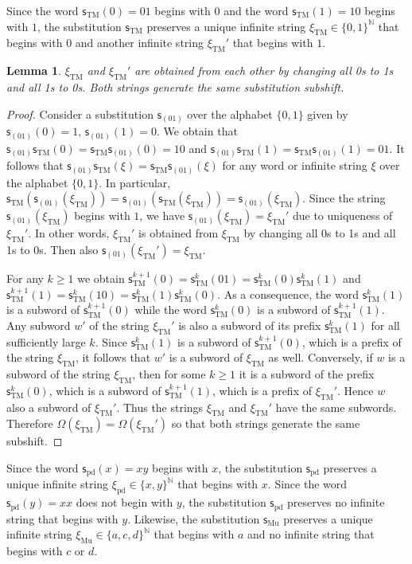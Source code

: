 \documentclass[12pt]{article}
\newtheorem{lemma}[theorem]{Lemma}
\theoremstyle{definition}
\def\bN{\mathbb{N}}
\def\Om{\Omega}
\def\subst{\mathsf{s}}
\def\TM{\subst_{\mathrm{TM}}}
\def\pd{\subst_{\mathrm{pd}}}
\def\sub{\subst_{\mathrm{Mu}}}
\def\xiTM{\xi_{\mathrm{TM}}}
\def\xipd{\xi_{\mathrm{pd}}}
\def\xiGE{\xi_{\mathrm{Mu}}}
\begin{document}
Since the word $\TM(0)=01$ begins with $0$ and the word $\TM(1)=10$ begins 
with $1$, the substitution $\TM$ preserves a unique infinite string 
$\xiTM\in\{0,1\}^{\bN}$ that begins with $0$ and another infinite string 
$\xiTM'$ that begins with $1$.

\begin{lemma}\label{TM-unique}
$\xiTM$ and $\xiTM'$ are obtained from each other by changing all 0s to 1s 
and all 1s to 0s.  Both strings generate the same substitution subshift.
\end{lemma}

\begin{proof}
Consider a substitution $\mathsf{s}_{(01)}$ over the alphabet $\{0,1\}$ 
given by $\mathsf{s}_{(01)}(0)=1$, $\mathsf{s}_{(01)}(1)=0$.  We obtain 
that $\mathsf{s}_{(01)}\TM(0)=\TM\mathsf{s}_{(01)}(0)=10$ and 
$\mathsf{s}_{(01)}\TM(1)=\TM\mathsf{s}_{(01)}(1)=01$.  It follows that 
$\mathsf{s}_{(01)}\TM(\xi)=\TM\mathsf{s}_{(01)}(\xi)$ for any word or 
infinite string $\xi$ over the alphabet $\{0,1\}$.  In particular, 
$\TM(\mathsf{s}_{(01)}(\xiTM))=\mathsf{s}_{(01)}(\TM(\xiTM)) 
=\mathsf{s}_{(01)}(\xiTM)$.  Since the string $\mathsf{s}_{(01)}(\xiTM)$ 
begins with $1$, we have $\mathsf{s}_{(01)}(\xiTM)=\xiTM'$ due to 
uniqueness of $\xiTM'$.  In other words, $\xiTM'$ is obtained from $\xiTM$ 
by changing all 0s to 1s and all 1s to 0s.  Then also 
$\mathsf{s}_{(01)}(\xiTM')=\xiTM$.

For any $k\ge1$ we obtain $\TM^{k+1}(0)=\TM^k(01)=\TM^k(0)\TM^k(1)$ and 
$\TM^{k+1}(1)=\TM^k(10)=\TM^k(1)\TM^k(0)$.  As a consequence, the word 
$\TM^k(1)$ is a subword of $\TM^{k+1}(0)$ while the word $\TM^k(0)$ is a 
subword of $\TM^{k+1}(1)$.  Any subword $w'$ of the string $\xiTM'$ is also 
a subword of its prefix $\TM^k(1)$ for all sufficiently large $k$.  Since 
$\TM^k(1)$ is a subword of $\TM^{k+1}(0)$, which is a prefix of the string 
$\xiTM$, it follows that $w'$ is a subword of $\xiTM$ as well.  Conversely, 
if $w$ is a subword of the string $\xiTM$, then for some $k\ge1$ it is a 
subword of the prefix $\TM^k(0)$, which is a subword of $\TM^{k+1}(1)$, 
which is a prefix of $\xiTM'$.  Hence $w$ also a subword of $\xiTM'$.  Thus 
the strings $\xiTM$ and $\xiTM'$ have the same subwords.  Therefore 
$\Om(\xiTM)=\Om(\xiTM')$ so that both strings generate the same subshift.
\end{proof}

Since the word $\pd(x)=xy$ begins with $x$, the substitution $\pd$ 
preserves a unique infinite string $\xipd\in\{x,y\}^{\bN}$ that begins with 
$x$.  Since the word $\pd(y)=xx$ does not begin with $y$, the substitution 
$\pd$ preserves no infinite string that begins with $y$.  Likewise, the 
substitution $\sub$ preserves a unique infinite string 
$\xiGE\in\{a,c,d\}^{\bN}$ that begins with $a$ and no infinite string that 
begins with $c$ or $d$.
\end{document}
